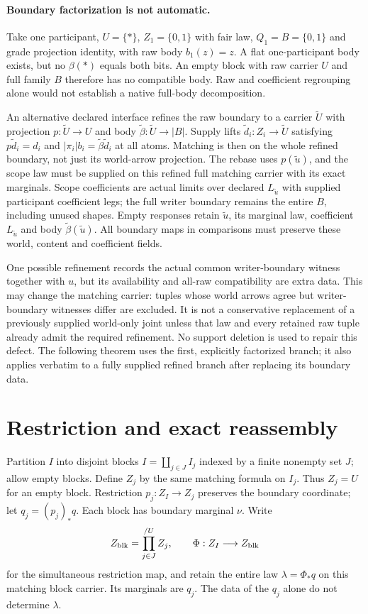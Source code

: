 \documentclass[11pt]{article}
\begin{document}
\paragraph{Boundary factorization is not automatic.}
Take one participant, $U=\{*\}$, $Z_1=\{0,1\}$ with fair law, $Q_1=B=\{0,1\}$ and grade projection identity, with raw body $b_1(z)=z$. A flat one-participant body exists, but no $\beta(*)$ equals both bits. An empty block with raw carrier $U$ and full family $B$ therefore has no compatible body. Raw and coefficient regrouping alone would not establish a native full-body decomposition.

An alternative declared interface refines the raw boundary to a carrier $\widetilde U$ with projection $p:\widetilde U\to U$ and body $\widetilde\beta:\widetilde U\to|B|$. Supply lifts $\widetilde d_i:Z_i\to\widetilde U$ satisfying $p\widetilde d_i=d_i$ and $|\pi_i|b_i=\widetilde\beta\widetilde d_i$ at all atoms. Matching is then on the whole refined boundary, not just its world-arrow projection. The rebase uses $p(\widetilde u)$, and the scope law must be supplied on this refined full matching carrier with its exact marginals. Scope coefficients are actual limits over declared $L_{\widetilde u}$ with supplied participant coefficient legs; the full writer boundary remains the entire $B$, including unused shapes. Empty responses retain $\widetilde u$, its marginal law, coefficient $L_{\widetilde u}$ and body $\widetilde\beta(\widetilde u)$. All boundary maps in comparisons must preserve these world, content and coefficient fields.

One possible refinement records the actual common writer-boundary witness together with $u$, but its availability and all-raw compatibility are extra data. This may change the matching carrier: tuples whose world arrows agree but writer-boundary witnesses differ are excluded. It is not a conservative replacement of a previously supplied world-only joint unless that law and every retained raw tuple already admit the required refinement. No support deletion is used to repair this defect. The following theorem uses the first, explicitly factorized branch; it also applies verbatim to a fully supplied refined branch after replacing its boundary data.

\section{Restriction and exact reassembly}
Partition $I$ into disjoint blocks $I=\coprod_{j\in J}I_j$ indexed by a finite nonempty set $J$; allow empty blocks. Define $Z_j$ by the same matching formula on $I_j$. Thus $Z_j=U$ for an empty block. Restriction $p_j:Z_I\to Z_j$ preserves the boundary coordinate; let $q_j=(p_j)_*q$. Each block has boundary marginal $\nu$. Write
\[
 Z_{\rm blk}=\prod_{j\in J}^{/U}Z_j,
 \qquad \Phi:Z_I\longrightarrow Z_{\rm blk}
\]
for the simultaneous restriction map, and retain the entire law $\lambda=\Phi_*q$ on this matching block carrier. Its marginals are $q_j$. The data of the $q_j$ alone do not determine $\lambda$.
\end{document}
